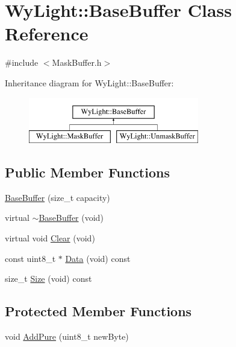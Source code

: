 \hypertarget{class_wy_light_1_1_base_buffer}{\section{Wy\-Light\-:\-:Base\-Buffer Class Reference}
\label{class_wy_light_1_1_base_buffer}
}


{\ttfamily \#include $<$Mask\-Buffer.\-h$>$}

Inheritance diagram for Wy\-Light\-:\-:Base\-Buffer\-:\begin{figure}[H]
\begin{center}
\leavevmode
\includegraphics[height=2.000000cm]{class_wy_light_1_1_base_buffer}
\end{center}
\end{figure}
\subsection*{Public Member Functions}
\begin{DoxyCompactItemize}
\item 
\hyperlink{class_wy_light_1_1_base_buffer_a3a45cf0d57bbf72a0eb26fbc27b71b6c}{Base\-Buffer} (size\-\_\-t capacity)
\item 
virtual \hyperlink{class_wy_light_1_1_base_buffer_a0aa58a0961102462df6833aeb97a994f}{$\sim$\-Base\-Buffer} (void)
\item 
virtual void \hyperlink{class_wy_light_1_1_base_buffer_ad7c6538cc7136f71a96efe6d85c8ff8f}{Clear} (void)
\item 
const uint8\-\_\-t $\ast$ \hyperlink{class_wy_light_1_1_base_buffer_aae9c729bfa00ff4d4628da666b858c60}{Data} (void) const 
\item 
size\-\_\-t \hyperlink{class_wy_light_1_1_base_buffer_a6aa8fcfeaeeb093bce60211a3728337a}{Size} (void) const 
\end{DoxyCompactItemize}
\subsection*{Protected Member Functions}
\begin{DoxyCompactItemize}
\item 
void \hyperlink{class_wy_light_1_1_base_buffer_a528639672ade7ec49160c5297b246055}{Add\-Pure} (uint8\-\_\-t new\-Byte)
\end{DoxyCompactItemize}
